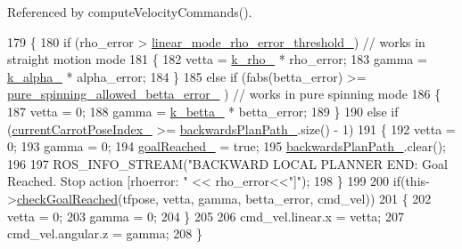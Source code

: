 Referenced by compute\+Velocity\+Commands().


\begin{DoxyCode}
179         \{
180             \textcolor{keywordflow}{if} (rho\_error > \hyperlink{classcl__move__base__z_1_1backward__local__planner_1_1BackwardLocalPlanner_a858efacf597a3a35c97aec9ca53e5900}{linear\_mode\_rho\_error\_threshold\_}) \textcolor{comment}{// works in
       straight motion mode}
181             \{
182                 vetta = \hyperlink{classcl__move__base__z_1_1backward__local__planner_1_1BackwardLocalPlanner_ad8a36184bfb011545c751109e23d3b98}{k\_rho\_} * rho\_error;
183                 gamma = \hyperlink{classcl__move__base__z_1_1backward__local__planner_1_1BackwardLocalPlanner_abf7a5a56de2ee41afba7e63c0628ec35}{k\_alpha\_} * alpha\_error;
184             \}
185             \textcolor{keywordflow}{else} \textcolor{keywordflow}{if} (fabs(betta\_error) >= \hyperlink{classcl__move__base__z_1_1backward__local__planner_1_1BackwardLocalPlanner_a957d163366cfeaf20d5534a7208fc326}{pure\_spinning\_allowed\_betta\_error\_}
      ) \textcolor{comment}{// works in pure spinning mode}
186             \{
187                 vetta = 0;
188                 gamma = \hyperlink{classcl__move__base__z_1_1backward__local__planner_1_1BackwardLocalPlanner_a9f257183d87f1d732cb7e404f09905ad}{k\_betta\_} * betta\_error;
189             \}
190             \textcolor{keywordflow}{else} \textcolor{keywordflow}{if} (\hyperlink{classcl__move__base__z_1_1backward__local__planner_1_1BackwardLocalPlanner_a2e8f2b78bc97f27c5fa431f3af2261ed}{currentCarrotPoseIndex\_} >= 
      \hyperlink{classcl__move__base__z_1_1backward__local__planner_1_1BackwardLocalPlanner_ad9cde5c85f782cab2ddb4030e3c3f2cf}{backwardsPlanPath\_}.size() - 1)
191             \{
192                 vetta = 0;
193                 gamma = 0;
194                 \hyperlink{classcl__move__base__z_1_1backward__local__planner_1_1BackwardLocalPlanner_ad443c52ef585a8eab0364f0909222f51}{goalReached\_} = \textcolor{keyword}{true};
195                 \hyperlink{classcl__move__base__z_1_1backward__local__planner_1_1BackwardLocalPlanner_ad9cde5c85f782cab2ddb4030e3c3f2cf}{backwardsPlanPath\_}.clear();
196 
197                 ROS\_INFO\_STREAM(\textcolor{stringliteral}{"BACKWARD LOCAL PLANNER END: Goal Reached. Stop action [rhoerror: "} << 
      rho\_error<<\textcolor{stringliteral}{"]"});
198             \}
199 
200             \textcolor{keywordflow}{if}(this->\hyperlink{classcl__move__base__z_1_1backward__local__planner_1_1BackwardLocalPlanner_a6c4363e82119a6a8a5a3bfe309280898}{checkGoalReached}(tfpose, vetta, gamma, betta\_error, cmd\_vel))
201             \{            
202                 vetta = 0;
203                 gamma = 0;
204             \}
205 
206             cmd\_vel.linear.x = vetta;
207             cmd\_vel.angular.z = gamma;
208         \}
\end{DoxyCode}

